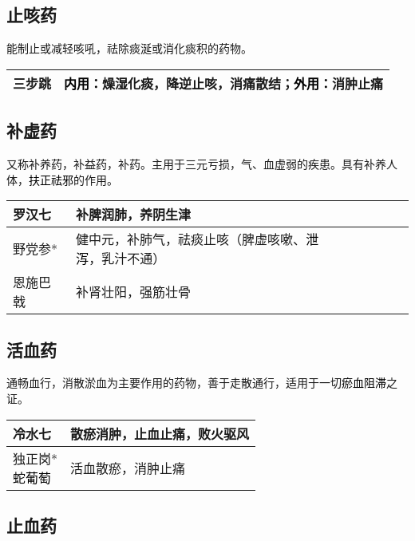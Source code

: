 \documentclass[cn,hazy,black,12pt,normal,founder]{elegantnote}
\newcommand{\redt}[1]{\textcolor{black}{{}#1}}      %
\begin{document}
\subsection{止咳药}

能制止或减轻咳吼，祛除痰涎或消化痰积的药物。

\begin{table}[H]
  \begin{tabular}{|l|l|}
  \hline
  三步跳 & \redt{内用：}燥湿化痰，降逆止咳，消痛散结；\redt{外用：}消肿止痛     \\ \hline
  \end{tabular}
\end{table}

\subsection{补虚药}

又称补养药，补益药，补药。主用于三元亏损，气、血虚弱的疾患。具有补养人体，\redt{扶正祛邪}的作用。

\begin{table}[H]
  \begin{tabular}{|l|l|}
  \hline
  罗汉七 & 补脾润肺，养阴生津 \\ \hline
  野党参* & 健中元，补肺气，祛痰止咳（脾虚咳嗽、\redt{泄泻}，乳汁不通）  \\  \hline
  恩施巴戟 & 补肾壮阳，强筋壮骨 \\ \hline
  \end{tabular}
\end{table}

\subsection{活血药}

通畅血行，消散淤血为主要作用的药物，善于走散通行，适用于一切\redt{瘀血阻滞}之证。

\begin{table}[H]
  \begin{tabular}{|l|l|}
  \hline
  冷水七 & 散瘀消肿，止血止痛，败火驱风 \\ \hline
  \makecell[l]{独正岗* \\ \redt{蛇葡萄}} & 活血散瘀，消肿止痛  \\  \hline
  \end{tabular}
\end{table}

\subsection{止血药}
\end{document}
